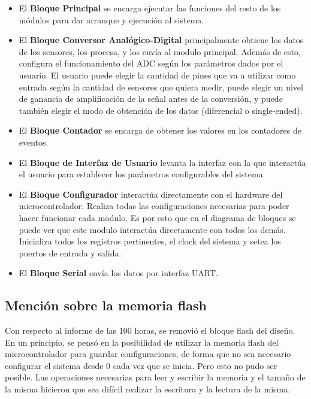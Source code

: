 \begin{itemize}
  \item El \textbf{Bloque Principal} se encarga ejecutar las funciones del resto de los m\'odulos para dar arranque y ejecuci\'on al sistema.
  \item El \textbf{Bloque Conversor Anal\'ogico-Digital} principalmente obtiene los datos de los sensores, los procesa, y los env\'ia al modulo principal. Adem\'as de esto, configura el funcionamiento del ADC seg\'un los par\'ametros dados por el usuario. El usuario puede elegir la cantidad de pines que va a utilizar como entrada seg\'un la cantidad de sensores que quiera medir, puede elegir un nivel de ganancia de amplificaci\'on de la se\~nal antes de la conversi\'on, y puede tambi\'en elegir el modo de obtenci\'on de los datos (diferencial o single-ended).
  \item El \textbf{Bloque Contador} se encarga de obtener los valores en los contadores de eventos.
  \item El \textbf{Bloque de Interfaz de Usuario} levanta la interfaz con la que interact\'ua el usuario para establecer los par\'ametros configurables del sistema.
  \item El \textbf{Bloque Configurador} interact\'ua directamente con el hardware del microcontrolador. Realiza todas las configuraciones necesarias para poder hacer funcionar cada modulo. Es por esto que en el diagrama de bloques se puede ver que este modulo interact\'ua directamente con todos los dem\'as. Inicializa todos los registros pertinentes, el clock del sistema y setea los puertos de entrada y salida.
  \item El \textbf{Bloque Serial} env\'ia los datos por interfaz UART.
\end{itemize}

\subsection{Menci\'on sobre la memoria flash} %
\label{sub:mencion_sobre_la_memoria_flash}

Con respecto al informe de las 100 horas, se removi\'o el bloque flash del dise\~no. En un principio, se pens\'o en la posibilidad de utilizar la memoria flash del microcontrolador para guardar configuraciones, de forma que no sea necesario configurar el sistema desde 0 cada vez que se inicia. Pero esto no pudo ser posible. Las operaciones necesarias para leer y escribir la memoria y el tama\~no de la misma hicieron que sea dif\'icil realizar la escritura y la lectura de la misma.

